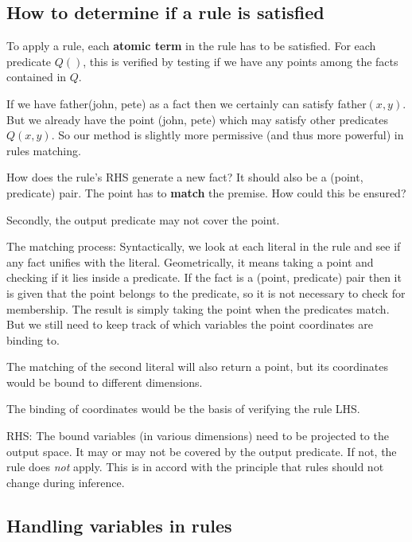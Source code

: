 \subsection{How to determine if a rule is satisfied}

To apply a rule, each \textbf{atomic term} in the rule has to be satisfied.  For each predicate $Q()$, this is verified by testing if we have any points among the facts contained in $Q$.

If we have \textsf{father(john, pete)} as a fact then we certainly can satisfy \textsf{father}$(x,y)$.  But we already have the point \textsf{(john, pete)} which may satisfy other predicates $Q(x,y)$.  So our method is slightly more permissive (and thus more powerful) in rules matching.

How does the rule's RHS generate a new fact?  It should also be a (point, predicate) pair.  The point has to \textbf{match} the premise.  How could this be ensured?

Secondly, the output predicate may not cover the point.

The matching process:  Syntactically, we look at each literal in the rule and see if any fact unifies with the literal.  Geometrically, it means taking a point and checking if it lies inside a predicate.  If the fact is a (point, predicate) pair then it is given that the point belongs to the predicate, so it is not necessary to check for membership.  The result is simply taking the point when the predicates match.  But we still need to keep track of which variables the point coordinates are binding to.

The matching of the second literal will also return a point, but its coordinates would be bound to different dimensions.  

The binding of coordinates would be the basis of verifying the rule LHS.

RHS:  The bound variables (in various dimensions) need to be projected to the output space.  It may or may not be covered by the output predicate.  If not, the rule does \textit{not} apply.  This is in accord with the principle that rules should not change during inference.

\subsection{Handling variables in rules}


